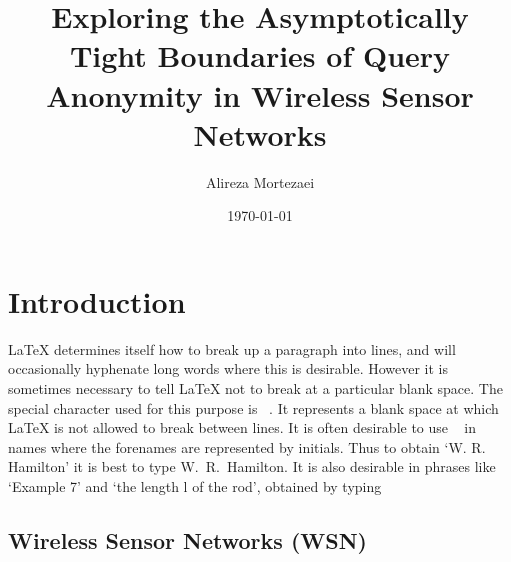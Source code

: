 \documentclass[12pt]{report}
\title{Exploring the Asymptotically Tight Boundaries of Query Anonymity in Wireless Sensor Networks}
\author{Alireza Mortezaei}
\date{ \today}
\begin{document}
\maketitle
\tableofcontents
{}
\listoffigures
{}
 \listoftables
\cleardoublepage 
{} 
\chapter{Introduction}


LaTeX determines itself how to break up a paragraph into lines, and will occasionally hyphenate long words where this is desirable. However it is sometimes necessary to tell LaTeX not to break at a particular blank space. The special character used for this purpose is ~. It represents a blank space at which LaTeX is not allowed to break between lines. It is often desirable to use ~ in names where the forenames are represented by initials. Thus to obtain `W. R. Hamilton' it is best to type W.~R.~Hamilton. It is also desirable in phrases like `Example 7' and `the length l of the rod', obtained by typing



\section{Wireless Sensor Networks (WSN)}
\end{document}
